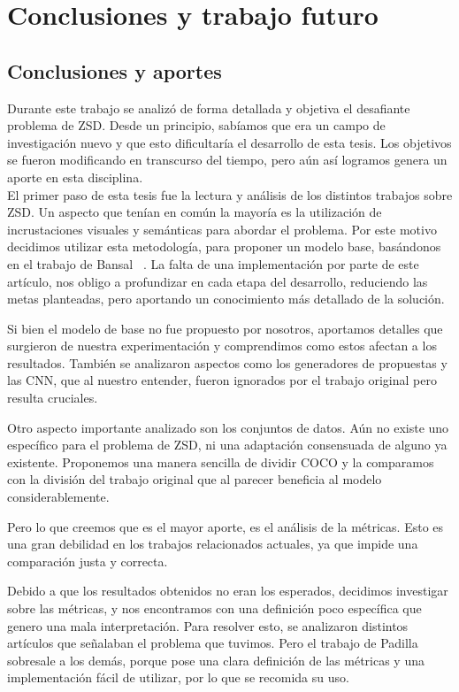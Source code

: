 \chapter{Conclusiones y trabajo futuro} \label{cap:conclusiones}

\section{Conclusiones y aportes} \label{sec:conclusionesyaportes}
Durante este trabajo se analizó de forma detallada y objetiva el desafiante problema de ZSD. Desde un principio, sabíamos que era un campo de investigación nuevo y que esto dificultaría el desarrollo de esta tesis. Los objetivos se fueron modificando en transcurso del tiempo, pero aún así logramos genera un aporte en esta disciplina.\\

El primer paso de esta tesis fue la lectura y análisis de los distintos trabajos sobre ZSD. Un aspecto que tenían en común la mayoría es la utilización de incrustaciones visuales y semánticas para abordar el problema. Por este motivo decidimos utilizar esta metodología, para proponer un modelo base, basándonos en el trabajo de Bansal \etal~\cite{bansal2018zero}. La falta de una implementación por parte de este artículo, nos obligo a profundizar en cada etapa del desarrollo, reduciendo las metas planteadas, pero aportando un conocimiento más detallado de la solución. 

Si bien el modelo de base no fue propuesto por nosotros, aportamos detalles que surgieron de nuestra experimentación y comprendimos como estos afectan a los resultados. También se analizaron aspectos como los generadores de propuestas y las CNN, que al nuestro entender, fueron ignorados por el trabajo original pero resulta cruciales.

Otro aspecto importante analizado son los conjuntos de datos. Aún no existe uno específico para el problema de ZSD, ni una adaptación consensuada de alguno ya existente. Proponemos una manera sencilla de dividir COCO y la comparamos con la división del trabajo original que al parecer beneficia al modelo considerablemente.

Pero lo que creemos que es el mayor aporte, es el análisis de la métricas. Esto es una gran debilidad en los trabajos relacionados actuales, ya que impide una comparación justa y correcta. 

Debido a que los resultados obtenidos no eran los esperados, decidimos investigar sobre las métricas, y nos encontramos con una definición poco específica que genero una mala interpretación. Para resolver esto, se analizaron distintos artículos que señalaban el problema que tuvimos. Pero el trabajo de Padilla \etal~\cite{padilla2020survey} sobresale a los demás, porque pose una clara definición de las métricas y una implementación fácil de utilizar, por lo que se recomida su uso.

